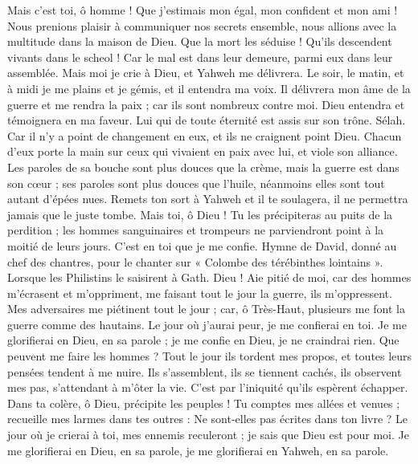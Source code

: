 \begin{multicols}{2}
Mais c'est toi, ô homme ! Que j'estimais mon égal, mon confident et mon ami !
Nous prenions plaisir à communiquer nos secrets ensemble, nous allions avec la multitude dans la maison de Dieu.
Que la mort les séduise ! Qu'ils descendent vivants dans le scheol ! Car le mal est dans leur demeure, parmi eux dans leur assemblée.
Mais moi je crie à Dieu, et Yahweh me délivrera.
Le soir, le matin, et à midi je me plains et je gémis, et il entendra ma voix.
Il délivrera mon âme de la guerre et me rendra la paix ; car ils sont nombreux contre moi.
Dieu entendra et témoignera en ma faveur. Lui qui de toute éternité est assis sur son trône. Sélah. Car il n'y a point de changement en eux, et ils ne craignent point Dieu.
Chacun d'eux porte la main sur ceux qui vivaient en paix avec lui, et viole son alliance.
Les paroles de sa bouche sont plus douces que la crème, mais la guerre est dans son cœur ; ses paroles sont plus douces que l'huile, néanmoins elles sont tout autant d'épées nues.
Remets ton sort à Yahweh et il te soulagera, il ne permettra jamais que le juste tombe.
Mais toi, ô Dieu ! Tu les précipiteras au puits de la perdition ; les hommes sanguinaires et trompeurs ne parviendront point à la moitié de leurs jours. C'est en toi que je me confie.
\VerseOne{}Hymne de David, donné au chef des chantres, pour le chanter sur « Colombe des térébinthes lointains ». Lorsque les Philistins le saisirent à Gath.
Dieu ! Aie pitié de moi, car des hommes m'écrasent et m'oppriment, me faisant tout le jour la guerre, ils m'oppressent.
Mes adversaires me piétinent tout le jour ; car, ô Très-Haut, plusieurs me font la guerre comme des hautains.
Le jour où j'aurai peur, je me confierai en toi.
Je me glorifierai en Dieu, en sa parole ; je me confie en Dieu, je ne craindrai rien. Que peuvent me faire les hommes ?
Tout le jour ils tordent mes propos, et toutes leurs pensées tendent à me nuire.
Ils s'assemblent, ils se tiennent cachés, ils observent mes pas, s'attendant à m'ôter la vie.
C'est par l'iniquité qu'ils espèrent échapper. Dans ta colère, ô Dieu, précipite les peuples !
Tu comptes mes allées et venues ; recueille mes larmes dans tes outres : Ne sont-elles pas écrites dans ton livre ?
Le jour où je crierai à toi, mes ennemis reculeront ; je sais que Dieu est pour moi.
Je me glorifierai en Dieu, en sa parole, je me glorifierai en Yahweh, en sa parole.

\end{multicols}
